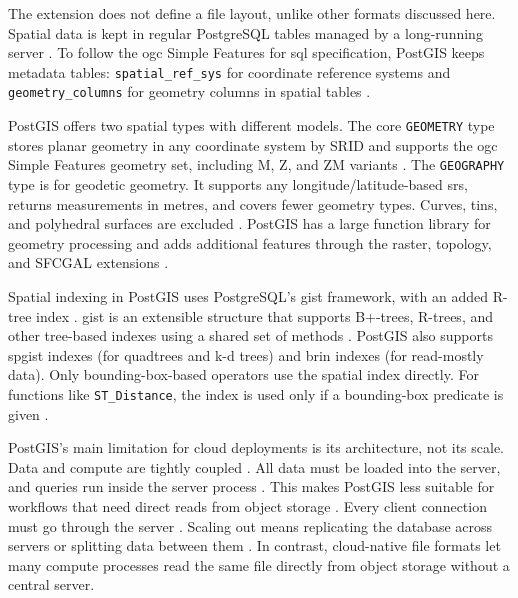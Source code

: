The extension does not define a file layout, unlike other formats discussed here. Spatial data is kept in regular PostgreSQL tables \parencite{postgis2024_manual_34} managed by a long-running server \parencite{postgresql2024_architectural_fundamentals}. To follow the \acrshort{ogc} Simple Features for \acrshort{sql} specification, PostGIS keeps metadata tables: \texttt{spatial\_ref\_sys} for coordinate reference systems and \texttt{geometry\_columns} for geometry columns in spatial tables \parencite{postgis2024_manual_34}.

PostGIS offers two spatial types with different models. The core \texttt{GEOMETRY} type stores planar geometry in any coordinate system by SRID and supports the \acrshort{ogc} Simple Features geometry set, including M, Z, and ZM variants \parencite{postgis2024_manual_34}. The \texttt{GEOGRAPHY} type is for geodetic geometry. It supports any longitude/latitude-based \acrshort{srs}, returns measurements in metres, and covers fewer geometry types. Curves, \acrshort{tin}s, and polyhedral surfaces are excluded \parencite{postgis2024_manual_34}. PostGIS has a large function library for geometry processing and adds additional features through the raster, topology, and SFCGAL extensions \parencite{postgis2024_manual_34}.

Spatial indexing in PostGIS uses PostgreSQL's \acrfull{gist} framework, with an added R-tree index \parencite{postgis2024_manual_34, hellerstein1995_generalized_search_trees_database_systems}. \acrshort{gist} is an extensible structure that supports B+-trees, R-trees, and other tree-based indexes using a shared set of methods \parencite{hellerstein1995_generalized_search_trees_database_systems}. PostGIS also supports \acrfull{spgist} indexes (for quadtrees and k-d trees) and \acrshort{brin} indexes (for read-mostly data). Only bounding-box-based operators use the spatial index directly. For functions like \texttt{ST\_Distance}, the index is used only if a bounding-box predicate is given \parencite{postgis2024_manual_34}.

PostGIS's main limitation for cloud deployments is its architecture, not its scale. Data and compute are tightly coupled \parencite{dageville2016_snowflake_elastic_data_warehouse}. All data must be loaded into the server, and queries run inside the server process \parencite{postgresql2024_architectural_fundamentals}. This makes PostGIS less suitable for workflows that need direct reads from object storage \parencite{pang2024_storage_disaggregated_databases}. Every client connection must go through the server \parencite{postgresql2024_architectural_fundamentals}. Scaling out means replicating the database across servers or splitting data between them \parencite{stonebraker1986_case_for_shared_nothing}. In contrast, cloud-native file formats let many compute processes read the same file directly from object storage without a central server.

